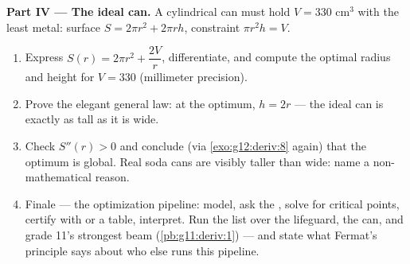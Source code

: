 \begin{problem}
\medskip
\noindent\textbf{Part IV --- The ideal can.}
A cylindrical can must hold $V = 330$ cm$^3$ with the least
metal: surface $S = 2\pi r^2 + 2\pi r h$, constraint
$\pi r^2 h = V$.
\begin{enumerate}[resume]
  \item Express $S(r) = 2\pi r^2 + \dfrac{2V}{r}$,
        differentiate, and compute the optimal radius and
        height for $V = 330$ (millimeter precision).
  \item Prove the elegant general law: at the optimum,
        $h = 2r$ --- the ideal can is exactly as tall as it is
        wide.
  \item Check $S''(r) > 0$ and conclude (via
        \cref{exo:g12:deriv:8} again) that the optimum is
        global. Real soda cans are visibly taller than wide:
        name a non-mathematical reason.
  \item Finale --- the optimization pipeline: model, ask the
        , solve for critical points, certify with
         or a table, interpret. Run the list over the
        lifeguard, the can, and grade 11's strongest beam
        (\cref{pb:g11:deriv:1}) --- and state what Fermat's
        principle says about who else runs this pipeline.
\end{enumerate}
\end{problem}
